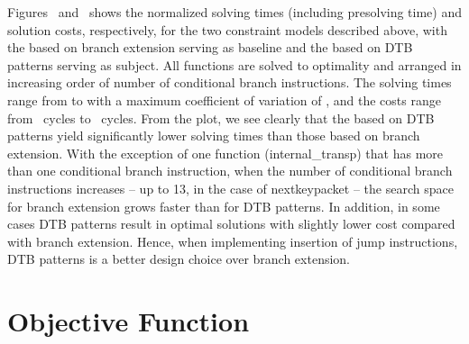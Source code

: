 Figures~
and~
shows the normalized solving times (including presolving time) and
\gls{solution} costs, respectively, for the two \glspl{constraint model}
described above, with the  based on \gls{branch
  extension} serving as \gls{baseline} and the  based
on \glspl{DTB pattern} serving as \gls{subject}.
%
All \glspl{function} are solved to optimality and arranged in increasing order
of number of conditional branch \glspl{instruction}.
%
The solving times range from
\SIMinOf{%
  \DualTargetPatternsVsBranchExtPrePlusSolvingTimeSpeedupSolvingTimeAvgMin,
  \DualTargetPatternsVsBranchExtPrePlusSolvingTimeSpeedupBaselineSolvingTimeAvgMin
}{\s}
to
\SIMaxOf{%
  \DualTargetPatternsVsBranchExtPrePlusSolvingTimeSpeedupSolvingTimeAvgMax,
  \DualTargetPatternsVsBranchExtPrePlusSolvingTimeSpeedupBaselineSolvingTimeAvgMax
}{\s}
with a maximum coefficient of variation of
\numMaxOf{%
  \DualTargetPatternsVsBranchExtPrePlusSolvingTimeSpeedupSolvingTimeCvMax,
  \DualTargetPatternsVsBranchExtPrePlusSolvingTimeSpeedupBaselineSolvingTimeCvMax
}, and the costs range from
\numMinOf[round-precision=0]{
  \DualTargetPatternsVsBranchExtCyclesSpeedupCyclesAvgMin,
  \DualTargetPatternsVsBranchExtCyclesSpeedupBaselineCyclesAvgMin
}~cycles to
\numMaxOf[round-precision=0]{
  \DualTargetPatternsVsBranchExtCyclesSpeedupCyclesAvgMax,
  \DualTargetPatternsVsBranchExtCyclesSpeedupBaselineCyclesAvgMax
}~cycles.
%
From the plot, we see clearly that the  based on
\glspl{DTB pattern} yield significantly lower solving times than those based on
\gls{branch extension}.
%
With the exception of one \gls{function} ({\codeFont internal\_transp}) that has
more than one conditional branch \gls{instruction}, when the number of
conditional branch \glspl{instruction} increases -- up to \num{13}, in the case
of {\codeFont nextkeypacket} -- the \gls{search space} for \gls{branch
  extension} grows faster than for \glspl{DTB pattern}.
%
In addition, in some cases \glspl{DTB pattern} result in optimal
\glspl{solution} with slightly lower cost compared with \gls{branch extension}.
%
Hence, when implementing insertion of jump \glspl{instruction}, \glspl{DTB
  pattern} is a better design choice over \gls{branch extension}.


\section{Objective Function}

